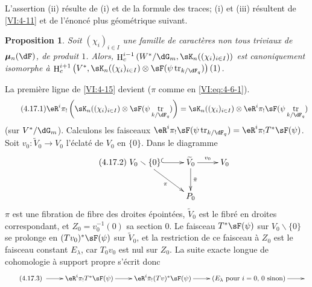 \documentclass[oneside]{book}
\DeclareMathOperator{\h}{H}
\DeclareMathOperator{\tr}{tr}
\newcommand{\dmu}{{\bm\mu}}
\renewcommand{\setminus}{\smallsetminus}
\theoremstyle{sga-source}
\theoremstyle{sga-source-dash}
\theoremstyle{sga-source-dotdash}
\theoremstyle{sga-source-number-note-dash}
\theoremstyle{sga-source-note-number-dotdash}
\theoremstyle{sga-source-example-dotdash}
\theoremstyle{sga-source-inline-number}
\theoremstyle{sga-source-bare-number}
\theoremstyle{sga-source}
\newtheorem{proposition_}[subsection]{Proposition}
\newcommand{\PrintPage}[1]{}\newcommand{\MathPage}[1]{}\newcommand{\PrintCite}[2]{#1}\newcommand{\var}[3]{#2}
\begin{document}
\PrintPage{205}
L'assertion (ii) résulte de (i) et de la formule des traces; (i) et (iii) 
résultent de \ref{VI:4-11} et de l'énoncé plus géométrique suivant. 





\begin{proposition_}\label{VI:4-17}
Soit $(\chi_i)_{i\in I}$ une famille de caractères non tous triviaux de 
$\dmu_n(\dF)$, de produit $1$. Alors, 
$\h_c^{i-1}\left(W^\ast/\dG_m,\var{\sK_m((\chi_i)_{i\in I})}{\sK_n((\chi_i)_{i\in I})}{S45-SOL-0847}\right)$ est 
canoniquement isomorphe à 
\newline
$\h_c^{i+1}\left(V^\ast,\var{\sK_m((\chi_i)_{i\in I})}{\sK_n((\chi_i)_{i\in I})}{S45-SOL-0847}\otimes \sF(\psi\tr_{k/\dF_q})\right)(1)$. 
\end{proposition_}

La première ligne de \ref{VI:4-15} devient ($\pi$ comme en 
\eqref{VI:eq:4-6-1}). 
\begin{equation*}\tag{4.17.1}\label{VI:eq:4-17-1}
  \eR^i \pi_!\left(\sK_n((\chi_i)_{i\in I})\otimes \sF(\psi \tr_{k/\dF_q})\right) = \sK_n((\chi_i)_{i\in I}) \otimes \eR^i \pi_! \sF(\psi\tr_{k/\dF_q}) 
\end{equation*}
(sur $V^\ast/\dG_m$). Calculons les faisceaux 
$\eR^i\pi_! \sF(\psi\tr_{k/\dF_q}) = \eR^i \pi_! T^\ast \sF(\psi)$. Soit 
$v_0:\widetilde V_0 \to V_0$ l'éclaté de $V_0$ en $\{0\}$. Dans le 
diagramme 
\begin{equation*}\tag{4.17.2}\label{VI:eq:4-17-2}
\xymatrix{
  V_0\setminus \{0\} \ar@{^{(}->}[r] \ar[dr]_-\pi 
    & \widetilde V_0 \ar[r]^-{v_0} \ar[d]^-{\bar\pi} 
    & V_0 \\
  & P_0 
}
\end{equation*}
$\pi$ est une fibration de fibre des droites épointées, $\widetilde V_0$ 
est le fibré en droites correspondant, et $Z_0=v_0^{-1}(0)$ sa section $0$. 
Le faisceau $T^\ast\sF(\psi)$ sur $V_0\setminus \{0\}$ se prolonge en 
$(T v_0)^\ast \sF(\psi)$ sur $\widetilde V_0$, et la restriction de ce faisceau 
à $Z_0$ est le faisceau constant $E_\lambda$, car $T_0 v_0$ est nul sur 
$Z_0$. La suite exacte longue de cohomologie à support propre s'écrit 
donc 
\begin{equation*}\tag{4.17.3}\label{VI:eq:4-17-3}
\xymatrix{
  \ar[r] 
    & \eR^i \pi_! T^\ast \sF(\psi) \ar[r] 
    & \eR^i \bar\pi_! (T v)^\ast \sF(\psi) \ar[r] 
    & (E_\lambda\text{ pour $i=0$, $0$ sinon}) \ar[r] 
    & 
}
\end{equation*}
\end{document}
